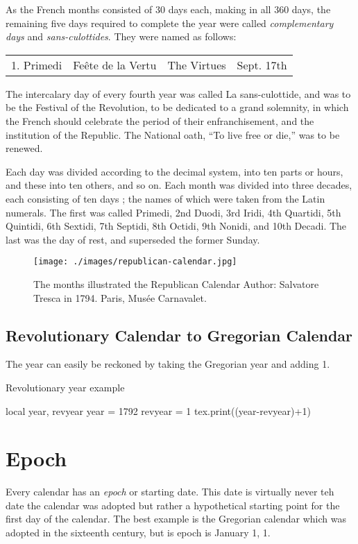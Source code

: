 As the French months consisted of 30 days each, making in all 360 days, the remaining five days required to complete the year were called \textit{complementary days} and \textit{sans-culottides}. They were named as follows:

\begin{tabular}{llll}
1. Primedi  & Fe\^ete de la Vertu  & The Virtues & Sept. 17th \\
\end{tabular}

The intercalary day of every fourth year was called La  sans-culottide, and was to be the Festival of 
the Revolution,  to be dedicated to a grand solemnity, in which the French should celebrate the period of their enfranchisement, and the  institution of the Republic. The National oath, \enquote{To live  free or die,} was to be renewed. 

Each day was divided according to the decimal system, 
into ten parts or hours, and these into ten others, and so on. 
Each month was divided into three decades, each consisting of ten days ; 
the names of which were taken from the 
Latin numerals. The first was called Primedi, 2nd Duodi, 3rd 
Iridi, 4th Quartidi, 5th Quintidi, 6th Sextidi, 7th Septidi, 8th 
Octidi, 9th Nonidi, and 10th Decadi. The last was the day 
of rest, and superseded the former Sunday. 

\begin{figure}[htp]
\centering
\texttt{[image: ./images/republican-calendar.jpg]}
\caption{The months illustrated the Republican Calendar  
Author: Salvatore Tresca in 1794. 
Paris, Musée Carnavalet. }
\end{figure}

\subsection{Revolutionary Calendar to Gregorian Calendar}

The year can easily be reckoned by taking the Gregorian year and adding 1. 

\begin{texexample}{Revolutionary year example}{}
\begin{luacode}
  local year, revyear
  year = 1792
  revyear = 1
  tex.print((year-revyear)+1)
\end{luacode}
\end{texexample}

\section{Epoch}
Every calendar has an \textit{epoch} or starting date. This date is virtually never teh date the calendar was adopted but rather a hypothetical starting point for the first day of the calendar. The best example is the Gregorian calendar which was adopted in the sixteenth century, but is epoch is January 1, 1.



